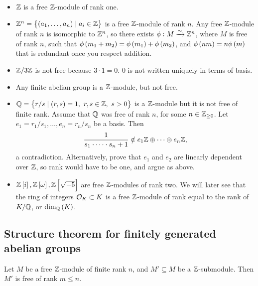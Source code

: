 \begin{example*}
\hfill
\begin{itemize}
\item $ \mathbb{Z} $ is a free $ \mathbb{Z} $-module of rank one.
\item $ \Z^n = \cbr{\br{a_1, \dots, a_n} \mid a_i \in \Z} $ is a free $ \mathbb{Z} $-module of rank $ n $. Any free $ \mathbb{Z} $-module of rank $ n $ is isomorphic to $ \mathbb{Z}^n $, so there exists $ \phi : M \xrightarrow{\sim} \mathbb{Z}^n $, where $ M $ is free of rank $ n $, such that $ \phi\br{m_1 + m_2} = \phi\br{m_1} + \phi\br{m_2} $, and $ \phi\br{nm} = n\phi\br{m} $ that is redundant once you respect addition.
\item $ \mathbb{Z} / 3\mathbb{Z} $ is not free because $ 3 \cdot 1 = 0 $. $ 0 $ is not written uniquely in terms of basis.
\item Any finite abelian group is a $ \mathbb{Z} $-module, but not free.
\item $ \Q = \cbr{r / s \mid \br{r, s} = 1, \ r, s \in \Z, \ s > 0} $ is a $ \mathbb{Z} $-module but it is not free of finite rank. Assume that $ \mathbb{Q} $ was free of rank $ n $, for some $ n \in \mathbb{Z}_{\ge 0} $. Let $ e_1 = r_1 / s_1, \dots, e_n = r_n / s_n $ be a basis. Then
$$ \dfrac{1}{s_1 \cdot \dots \cdot s_n + 1} \notin e_1\mathbb{Z} \oplus \dots \oplus e_n\mathbb{Z}, $$
a contradiction. Alternatively, prove that $ e_1 $ and $ e_2 $ are linearly dependent over $ \mathbb{Z} $, so rank would have to be one, and argue as above.
\item $ \Z\sbr{i}, \Z\sbr{\omega}, \Z\sbr{\sqrt{-5}} $ are free $ \mathbb{Z} $-modules of rank two. We will later see that the ring of integers $ \mathcal{O}_K \subset K $ is a free $ \mathbb{Z} $-module of rank equal to the rank of $ K / \mathbb{Q} $, or $ \dim_\Q\br{K} $.
\end{itemize}
\end{example*}

\pagebreak

\subsection{Structure theorem for finitely generated abelian groups}

\begin{theorem}
Let $ M $ be a free $ \mathbb{Z} $-module of finite rank $ n $, and $ M' \subseteq M $ be a $ \mathbb{Z} $-submodule. Then $ M' $ is free of rank $ m \le n $.
\end{theorem}

